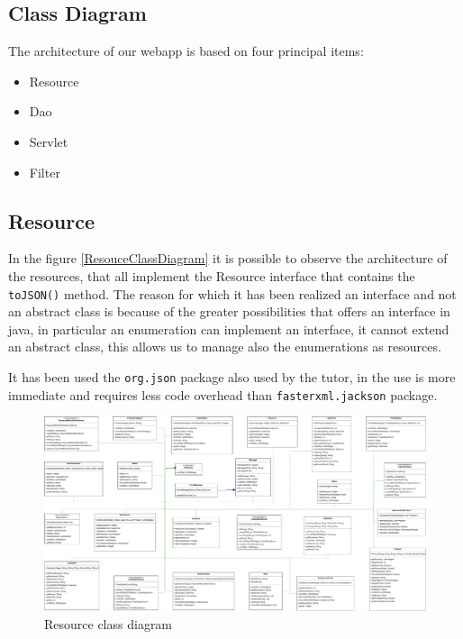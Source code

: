\subsection{Class Diagram}

The architecture of our webapp is based on four principal items:
\begin{itemize}
    \item Resource
    \item Dao
    \item Servlet
    \item Filter
\end{itemize}

\subsection*{Resource}

In the figure \ref{ResouceClassDiagram} it is possible to observe the 
architecture of the resources, that all implement the Resource interface 
that contains the \texttt{toJSON()} method. 
The reason for which it has been realized an interface and not an abstract 
class is because of the greater possibilities that offers an interface in 
java, in particular an enumeration can implement an interface, it cannot 
extend an abstract class, this allows us to manage also the enumerations 
as resources.

It has been used the \texttt{org.json} package also used by the tutor, in the 
use is more  immediate and requires less code overhead than 
\texttt{fasterxml.jackson} package.


\begin{figure}[H]
    \includegraphics[width=\textwidth,height=\textheight,keepaspectratio]{Schemas/resources.drawio.pdf}
    \caption{Resource class diagram}
    \label{fig:ResouceClassDiagram}
\end{figure}


